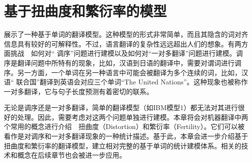 
%


\renewcommand\figurename{图}%
\renewcommand\tablename{表}%


\chapter{基于扭曲度和繁衍率的模型}

{\chapterfive}展示了一种基于单词的翻译模型。这种模型的形式非常简单，而且其隐含的词对齐信息具有较好的可解释性。不过，语言翻译的复杂性远远超出人们的想象。有两方面挑战\ \dash\ 如何对“ 调序”问题进行建模以及如何对“一对多翻译”问题进行建模。调序是翻译问题中所特有的现象，比如，汉语到日语的翻译中，需要对谓词进行调序。另一方面，一个单词在另一种语言中可能会被翻译为多个连续的词，比如，汉语“ 联合国”翻译到英语会对应三个单词“The United Nations”。这种现象也被称作一对多翻译，它与句子长度预测有着密切的联系。

无论是调序还是一对多翻译，简单的翻译模型（如IBM模型1）都无法对其进行很好的处理。因此，需要考虑对这两个问题单独进行建模。本章将会对机器翻译中两个常用的概念进行介绍\ \dash\ 扭曲度（Distortion）和繁衍率（Fertility）。它们可以被看作是对调序和一对多翻译现象的一种统计描述。基于此，本章会进一步介绍基于扭曲度和繁衍率的翻译模型，建立相对完整的基于单词的统计建模体系。相关的技术和概念在后续章节也会被进一步应用。



